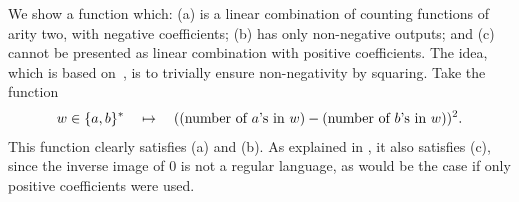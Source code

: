 \begin{myexample}\label{ex:quadratic-counterexample}
     We show  a function which: (a) is a linear combination of \mso  counting functions of arity two, with negative coefficients; (b) has only non-negative outputs; and (c) cannot be presented as linear combination with positive coefficients. The idea, which is based on~\cite[Example 2.1]{BerstelReutenauer08}, is to trivially ensure non-negativity by squaring. Take the function
\begin{align*}
w \in \{a,b\}^* 
\quad \mapsto \quad 
(\text{(number of $a$'s in $w$)} - \text{(number of $b$'s in $w$)})^2.
\end{align*}
This function clearly satisfies (a) and (b). As explained in \cite[p.3]{Zpolyreg23}, it also satisfies (c), since the inverse image of $0$ is not a regular language, as would be the case if only positive coefficients were used.
\end{myexample}
